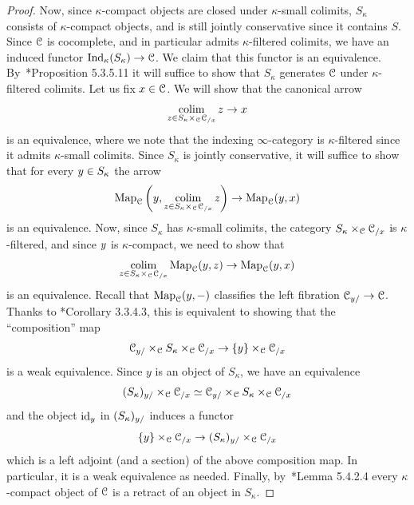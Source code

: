 \begin{proof}
Now, since $\kappa$-compact objects are closed under $\kappa$-small colimits, $S_\kappa$ consists of $\kappa$-compact objects, and is still jointly conservative since it contains $S$. 
Since $\mathcal C$ is cocomplete, and in particular admits $\kappa$-filtered colimits, we have an induced functor $\operatorname{Ind}_{\kappa}(S_{\kappa}) \to \mathcal C$. We claim that this functor is an equivalence. By~\cite{HTT}*{Proposition 5.3.5.11} it will suffice to show that $S_{\kappa}$ generates $\mathcal C$ under $\kappa$-filtered colimits.
Let us fix $x\in\mathcal C$. We will show that the canonical arrow
\[
\mathop{\mathrm{colim}}_{z\in S_{\kappa}\times_\mathcal C\mathcal C_{/x}}z\to x
\]
is an equivalence, where we note that the indexing $\infty$-category is $\kappa$-filtered since it admits $\kappa$-small colimits. Since $S_{\kappa}$ is jointly conservative, it will suffice to show that for every $y\in S_{\kappa}$ the arrow
\[
\operatorname{Map}_\mathcal C\left(y,\mathop{\mathrm{colim}}_{z\in S_{\kappa}\times_\mathcal C\mathcal C_{/x}}z\right)\to \operatorname{Map}_\mathcal C(y,x)
\]
is an equivalence. Now, since $S_{\kappa}$ has $\kappa$-small colimits, the category $S_{\kappa}\times_\mathcal C\mathcal C_{/x}$ is $\kappa$-filtered, and since $y$ is $\kappa$-compact, we need to show that
\[
\mathop{\mathrm{colim}}_{z\in S_{\kappa}\times_\mathcal C\mathcal C_{/x}}\operatorname{Map}_\mathcal C(y,z)\to \operatorname{Map}_\mathcal C(y,x)
\]
is an equivalence. Recall that $\operatorname{Map}_\mathcal C(y,-)$ classifies the left fibration $\mathcal C_{y/}\to \mathcal C$. Thanks to \cite{HTT}*{Corollary 3.3.4.3}, this is equivalent to showing that the ``composition'' map
\[
\mathcal C_{y/}\times_\mathcal C S_{\kappa}\times_\mathcal C\mathcal C_{/x}\to \{y\}\times_\mathcal C \mathcal C_{/x}
\]
is a weak equivalence. Since $y$ is an object of $S_{\kappa}$, we have an equivalence 
\[
(S_{\kappa})_{y/} \times_\mathcal C \mathcal C_{/x} \simeq \mathcal C_{y/}\times_\mathcal C S_{\kappa}\times_\mathcal C\mathcal C_{/x}
\]
and the object $\mathrm{id}_{y}$ in $(S_{\kappa})_{y/}$ induces a functor 
\[
\{y\} \times_\mathcal C \mathcal C_{/x} \to (S_{\kappa})_{y/} \times_\mathcal C \mathcal C_{/x}
\]
which is a left adjoint (and a section) of the above composition map. In particular, it is a weak equivalence as needed. Finally, by~\cite{HTT}*{Lemma 5.4.2.4} every $\kappa$-compact object of $\mathcal C$ is a retract of an object in $S_{\kappa}$.
\end{proof}

